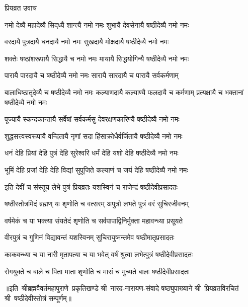 
\centerline{प्रियव्रत उवाच}
\twolineshloka
{नमो देव्यै महादेव्यै सिद्‍ध्यै शान्त्यै नमो नमः}
{शुभायै देवसेनायै षष्ठीदेव्यै नमो नमः}%

\twolineshloka
{वरदायै पुत्रदायै धनदायै नमो नमः}
{सुखदायै मोक्षदायै षष्ठीदेव्यै नमो नमः}%

\twolineshloka
{शक्तेः षष्ठांशरूपायै सिद्धायै च नमो नमः}
{मायायै सिद्धयोगिन्यै षष्ठीदेव्यै नमो नमः}%

\twolineshloka
{पारायै पारदायै च षष्ठीदेव्यै नमो नमः}
{सारायै सारदायै च पारायै सर्वकर्मणाम्}%

\threelineshloka
{बालाधिष्ठातृदेव्यै च षष्ठीदेव्यै नमो नमः}
{कल्याणदायै कल्याण्यै फलदायै च कर्मणाम्}
{प्रत्यक्षायै च भक्तानां षष्ठीदेव्यै नमो नमः}%

\twolineshloka
{पूज्यायै स्कन्दकान्तायै सर्वेषां सर्वकर्मसु}
{देवरक्षणकारिण्यै षष्ठीदेव्यै नमो नमः}%

\twolineshloka
{शुद्धसत्त्वस्वरूपायै वन्दितायै नृणां सदा}
{हिंसाक्रोधैर्वर्जितायै षष्ठीदेव्यै नमो नमः}%

\twolineshloka
{धनं देहि प्रियां देहि पुत्रं देहि सुरेश्वरि}
{धर्मं देहि यशो देहि षष्ठीदेव्यै नमो नमः}%

\twolineshloka
{भूमिं देहि प्रजां देहि देहि विद्यां सुपूजिते}
{कल्याणं च जयं देहि षष्ठीदेव्यै नमो नमः}%

\twolineshloka
{इति देवीं च संस्तूय लेभे पुत्रं प्रियव्रतः}
{यशस्विनं च राजेन्द्रं षष्ठीदेवीप्रसादतः}%

\twolineshloka
{षष्ठीस्तोत्रमिदं ब्रह्मण् यः शृणोति च वत्सरम्}
{अपुत्रो लभते पुत्रं वरं सुचिरजीवनम्}

\twolineshloka
{वर्षमेकं च या भक्त्या संयतेदं शृणोति च}
{सर्वपापाद्विनिर्मुक्ता महावन्ध्या प्रसूयते}

\twolineshloka
{वीरपुत्रं च गुणिनं विद्यावन्तं यशस्विनम्}
{सुचिरायुष्मन्तमेव षष्ठीमातृप्रसादतः}

\twolineshloka
{काकवन्ध्या च या नारी मृतापत्या च या भवेत्}
{वर्षं श्रुत्वा लभेत्पुत्रं षष्ठीदेवीप्रसादतः}

\twolineshloka
{रोगयुक्ते च बाले च पिता माता शृणोति च}
{मासं  च मुच्यते बालः षष्ठीदेवीप्रसादतः}

{॥इति~श्रीब्रह्मवैवर्तमहापुराणे~प्रकृतिखण्डे श्री~नारद-नारायण-संवादे षष्ठ्युपाख्याने श्री~प्रियव्रतविरचितं श्री~षष्ठीदेवीस्तोत्रं सम्पूर्णम्॥}